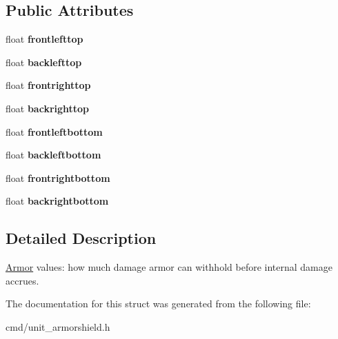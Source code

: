 \subsection*{Public Attributes}
\begin{DoxyCompactItemize}
\item 
float {\bfseries frontlefttop}\hypertarget{structArmor_a413afd76e79bdc6823ad2c5d2a0c2202}{}\label{structArmor_a413afd76e79bdc6823ad2c5d2a0c2202}

\item 
float {\bfseries backlefttop}\hypertarget{structArmor_a9585b2dd37bce70e4fee6512198d6d73}{}\label{structArmor_a9585b2dd37bce70e4fee6512198d6d73}

\item 
float {\bfseries frontrighttop}\hypertarget{structArmor_a39e0665da630045db4aed0f0997ad591}{}\label{structArmor_a39e0665da630045db4aed0f0997ad591}

\item 
float {\bfseries backrighttop}\hypertarget{structArmor_a6e8c588dbe204109bde79577471ef3be}{}\label{structArmor_a6e8c588dbe204109bde79577471ef3be}

\item 
float {\bfseries frontleftbottom}\hypertarget{structArmor_a68138db9177137ea221f6a5e0c5f6256}{}\label{structArmor_a68138db9177137ea221f6a5e0c5f6256}

\item 
float {\bfseries backleftbottom}\hypertarget{structArmor_a837d376f011a2010674c7aaf6a5cc32f}{}\label{structArmor_a837d376f011a2010674c7aaf6a5cc32f}

\item 
float {\bfseries frontrightbottom}\hypertarget{structArmor_a3b1069af1423c276a976e131c301d5ec}{}\label{structArmor_a3b1069af1423c276a976e131c301d5ec}

\item 
float {\bfseries backrightbottom}\hypertarget{structArmor_af138716be8ae4dadba058c3b5475083f}{}\label{structArmor_af138716be8ae4dadba058c3b5475083f}

\end{DoxyCompactItemize}


\subsection{Detailed Description}
\hyperlink{structArmor}{Armor} values\+: how much damage armor can withhold before internal damage accrues. 

The documentation for this struct was generated from the following file\+:\begin{DoxyCompactItemize}
\item 
cmd/unit\+\_\+armorshield.\+h\end{DoxyCompactItemize}
